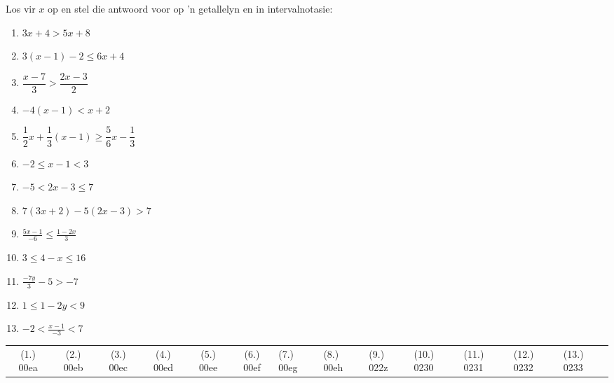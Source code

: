 \begin{exercises}{ }
{
Los vir $x$  op en stel die antwoord voor op 'n getallelyn en in intervalnotasie:
\begin{enumerate}[itemsep=6pt, label=\textbf{\arabic*}. ] 
    \item $3x+4>5x+8$
    \item $3(x-1)-2\leq 6x+4$ 
    \item $\dfrac{x-7}{3}>\dfrac{2x-3}{2}$
    \item $-4(x-1)<x+2$
    \item $\dfrac{1}{2}x+\dfrac{1}{3}(x-1)\geq \dfrac{5}{6}x-\dfrac{1}{3}$ 
    \item $-2\leq x-1<3$ 
    \item $-5<2x-3\leq7$ 
\item $7(3x+2)-5(2x-3)>7$
\item $\frac{5x - 1}{-6} \leq \frac{1-2x}{3}$
\item $3 \leq 4 - x \leq 16$
\item $\frac{-7y}{3} - 5 > -7$
\item $1 \leq 1 - 2y < 9$
\item $-2 < \frac{x-1}{-3}<7$
    \end{enumerate}

\practiceinfo

\par \begin{tabular}[h]{cccccc}
(1.) 00ea&  (2.) 00eb&  (3.) 00ec& (4.) 00ed& (5.) 00ee& (6.) 00ef& (7.) 00eg& (8.) 00eh & (9.) 022z & (10.) 0230 
& (11.) 0231 & (12.) 0232 & (13.) 0233 &\end{tabular}
}
\end{exercises}



